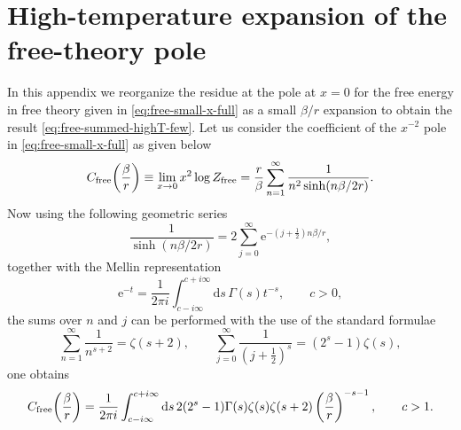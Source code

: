 \documentclass[a4paper,11pt]{article}
\newcommand{\e}{\mathrm e}
\newcommand{\dd}{\mathrm d}
\begin{document}
\appendix



\section{High-temperature expansion  of the free-theory pole}
\label{app:free-highT}
In this appendix we reorganize the residue at the pole at $x=0$ for the free energy in free theory given in \eqref{eq:free-small-x-full} as a small $\beta/r$ expansion to obtain the result \eqref{eq:free-summed-highT-few}.
Let us consider the coefficient of the $x^{-2}$ pole in \eqref{eq:free-small-x-full} as given below
\begin{equation}
	C_{\rm free}\!\left(\frac{\beta}{r}\right)
	\equiv
	\lim_{x\to0}x^2\log Z_{\rm free}
	=
	\frac{r}{\beta}
	\sum_{n=1}^{\infty}
	\frac{1}{n^2\sinh\!\left(n\beta/2r\right)}.
	\label{eq:app-free-def}
\end{equation}
Now using the following geometric series 
\begin{equation}
	\frac{1}{\sinh\!\left(n\beta/2r\right)}
	=
	2\sum_{j=0}^{\infty}
	\e^{-(j+\frac12)n\beta/r},
\end{equation}
together with the Mellin representation
\begin{equation}
	\e^{-t}
	=
	\frac{1}{2\pi i}
	\int_{c-i\infty}^{c+i\infty}\dd s\,
	\Gamma(s)t^{-s},
	\qquad c>0,
\end{equation}
the sums over $n$ and $j$ can be performed with the use of the standard formulae
\begin{equation}
	\sum_{n=1}^{\infty}\frac{1}{n^{s+2}}
	=
	\zeta(s+2),
	\qquad
	\sum_{j=0}^{\infty}
	\frac{1}{(j+\frac12)^s}
	=
	(2^s-1)\zeta(s),
\end{equation}
one obtains
\begin{equation}
	C_{\rm free}\!\left(\frac{\beta}{r}\right)
	=
	\frac{1}{2\pi i}
	\int_{c-i\infty}^{c+i\infty}\dd s\,
	2(2^s-1)\Gamma(s)\zeta(s)\zeta(s+2)
	\left(\frac{\beta}{r}\right)^{-s-1},
	\qquad c>1.
	\label{eq:app-free-MB}
\end{equation}
\end{document}
